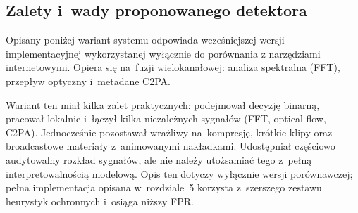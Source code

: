 \subsection{Zalety i~wady proponowanego detektora}
\label{sec:zalety_wady_wlasny}

Opisany poniżej wariant systemu odpowiada wcze\'{s}niejszej wersji implementacyjnej
wykorzystanej wyłącznie do porównania z narzędziami internetowymi.
Opiera się na~fuzji wielokanałowej: analiza spektralna (FFT), przepływ optyczny
i~metadane C2PA.

Wariant ten mia\l{} kilka zalet praktycznych: podejmowa\l{} decyzj\k{e} binarn\k{a},
pracowa\l{} lokalnie i~\l{}\k{a}czy\l{} kilka niezale\.{z}nych sygna\l{}\'{o}w
(FFT, optical flow, C2PA). Jednocze\'{s}nie pozostawa\l{} wra\.{z}liwy na~kompresj\k{e},
kr\'{o}tkie klipy oraz broadcastowe materia\l{}y z~animowanymi nak\l{}adkami.
Udost\k{e}pnia\l{} cz\k{e}\'{s}ciowo audytowalny rozk\l{}ad sygna\l{}\'{o}w,
ale nie nale\.{z}y uto\.{z}samia\'{c} tego z~pe\l{}n\k{a} interpretowalno\'{s}ci\k{a} modelow\k{a}.
Opis ten dotyczy wy\l{}\k{a}cznie wersji por\'{o}wnawczej; pe\l{}na implementacja opisana
w~rozdziale~5 korzysta z~szerszego zestawu heurystyk ochronnych i~osi\k{a}ga ni\.{z}szy FPR.
